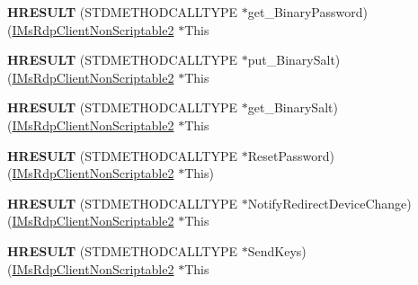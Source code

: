 \begin{DoxyCompactItemize}
{\bfseries H\+R\+E\+S\+U\+LT} (S\+T\+D\+M\+E\+T\+H\+O\+D\+C\+A\+L\+L\+T\+Y\+PE $\ast$get\+\_\+\+Binary\+Password)(\hyperlink{interface_m_s_t_s_c_lib_1_1_i_ms_rdp_client_non_scriptable2}{I\+Ms\+Rdp\+Client\+Non\+Scriptable2} $\ast$This
\item 
\mbox{\label{struct_m_s_t_s_c_lib_1_1_i_ms_rdp_client_non_scriptable2_vtbl_a60d3333244bab93f0b4334a243a02dd4}} 
{\bfseries H\+R\+E\+S\+U\+LT} (S\+T\+D\+M\+E\+T\+H\+O\+D\+C\+A\+L\+L\+T\+Y\+PE $\ast$put\+\_\+\+Binary\+Salt)(\hyperlink{interface_m_s_t_s_c_lib_1_1_i_ms_rdp_client_non_scriptable2}{I\+Ms\+Rdp\+Client\+Non\+Scriptable2} $\ast$This
\item 
\mbox{\label{struct_m_s_t_s_c_lib_1_1_i_ms_rdp_client_non_scriptable2_vtbl_a9fb6063b5c8f8ed47b419d218c529a42}} 
{\bfseries H\+R\+E\+S\+U\+LT} (S\+T\+D\+M\+E\+T\+H\+O\+D\+C\+A\+L\+L\+T\+Y\+PE $\ast$get\+\_\+\+Binary\+Salt)(\hyperlink{interface_m_s_t_s_c_lib_1_1_i_ms_rdp_client_non_scriptable2}{I\+Ms\+Rdp\+Client\+Non\+Scriptable2} $\ast$This
\item 
\mbox{\label{struct_m_s_t_s_c_lib_1_1_i_ms_rdp_client_non_scriptable2_vtbl_a18b31bc088b352cc97404af6d4abf8c7}} 
{\bfseries H\+R\+E\+S\+U\+LT} (S\+T\+D\+M\+E\+T\+H\+O\+D\+C\+A\+L\+L\+T\+Y\+PE $\ast$Reset\+Password)(\hyperlink{interface_m_s_t_s_c_lib_1_1_i_ms_rdp_client_non_scriptable2}{I\+Ms\+Rdp\+Client\+Non\+Scriptable2} $\ast$This)
\item 
\mbox{\label{struct_m_s_t_s_c_lib_1_1_i_ms_rdp_client_non_scriptable2_vtbl_a6d3470ead12927bc35776a6e0c908791}} 
{\bfseries H\+R\+E\+S\+U\+LT} (S\+T\+D\+M\+E\+T\+H\+O\+D\+C\+A\+L\+L\+T\+Y\+PE $\ast$Notify\+Redirect\+Device\+Change)(\hyperlink{interface_m_s_t_s_c_lib_1_1_i_ms_rdp_client_non_scriptable2}{I\+Ms\+Rdp\+Client\+Non\+Scriptable2} $\ast$This
\item 
\mbox{\label{struct_m_s_t_s_c_lib_1_1_i_ms_rdp_client_non_scriptable2_vtbl_a61f66e3ad7a5196209b4c3bc1d3f031c}} 
{\bfseries H\+R\+E\+S\+U\+LT} (S\+T\+D\+M\+E\+T\+H\+O\+D\+C\+A\+L\+L\+T\+Y\+PE $\ast$Send\+Keys)(\hyperlink{interface_m_s_t_s_c_lib_1_1_i_ms_rdp_client_non_scriptable2}{I\+Ms\+Rdp\+Client\+Non\+Scriptable2} $\ast$This

\end{DoxyCompactItemize}
